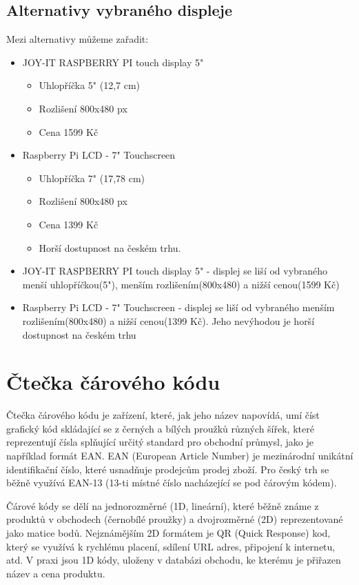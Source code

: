 \subsection{Alternativy vybraného displeje}
Mezi alternativy můžeme zařadit:
\begin{itemize}
    \item JOY-IT RASPBERRY PI touch display 5"
    \begin{itemize}
        \item Uhlopříčka 5" (12,7 cm)
        \item Rozlišení 800x480 px
        \item Cena 1599 Kč
    \end{itemize}
    \item Raspberry Pi LCD - 7" Touchscreen
    \begin{itemize}
        \item Uhlopříčka 7" (17,78 cm)
        \item Rozlišení 800x480 px
        \item Cena 1399 Kč
        \item Horší dostupnost na českém trhu.
    \end{itemize}


    \item JOY-IT RASPBERRY PI touch display 5" - displej se liší od vybraného menší uhlopříčkou(5"), menším rozlišením(800x480) a nižší cenou(1599 Kč)
    \item Raspberry Pi LCD - 7" Touchscreen - displej se liší od vybraného menším rozlišením(800x480) a nižší cenou(1399 Kč). Jeho nevýhodou je horší dostupnost na českém trhu
\end{itemize}


\section{Čtečka čárového kódu}
Čtečka čárového kódu je zařízení, které, jak jeho název napovídá, umí číst grafický kód skládající se z černých a bílých proužků různých šířek, které reprezentují čísla splňující určitý standard pro obchodní průmysl, jako je například formát EAN. EAN (European Article Number) je mezinárodní unikátní identifikační číslo, které usnadňuje prodejcům prodej zboží. Pro český trh se běžně využívá EAN-13 (13-ti místné číslo nacházející se pod čárovým kódem). 

Čárové kódy se dělí na jednorozměrné (1D, lineární), které běžně známe z produktů v obchodech (černobílé proužky) a dvojrozměrné (2D) reprezentované jako matice bodů. Nejznámějším 2D formátem je QR (Quick Response) kod, který se využívá k rychlému placení, sdílení URL adres, připojení k internetu, atd. V praxi jsou 1D kódy, uloženy v databázi obchodu, ke kterému je přiřazen název a cena produktu.

